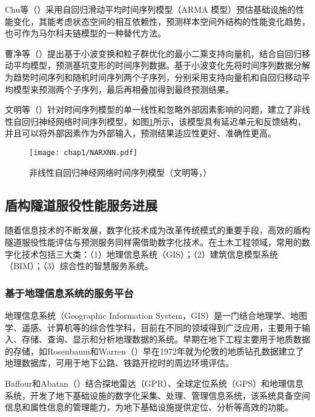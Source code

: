 Chu等（\citeyear{chu2007estimation}）采用自回归滑动平均时间序列模型（ARMA 模型）预估基础设施的性能变化，其能考虑状态空间的相互依赖性，预测样本空间外结构的性能变化趋势，也可作为马尔科夫链模型的一种替代方法。

曹净等（\citeyear{曹净2014基于}）提出基于小波变换和粒子群优化的最小二乘支持向量机，结合自回归移动平均模型，预测基坑变形的时间序列数据。基于小波变化先将时间序列数据分解为趋势时间序列和随机时间序列两个子序列，分别采用支持向量机和自回归移动平均模型来预测两个子序列，最后再相叠加得到最终预测结果。

文明等（\citeyear{文明2015地铁车站施工过程中地表沉降的}）针对时间序列模型的单一线性和忽略外部因素影响的问题，建立了非线性自回归神经网络时间序列模型，如图\ref{fig:非线性自回归神经网络}所示，该模型具有延迟单元和反馈结构，并且可以将外部因素作为外部输入，预测结果适应性更好、准确性更高。

\begin{figure}[!h]
	\centering
	\texttt{[image: chap1/NARXNN.pdf]}
	\caption{非线性自回归神经网络时间序列模型（文明等，\citeyear{文明2015地铁车站施工过程中地表沉降的}）}
	\label{fig:非线性自回归神经网络}
\end{figure}

\subsection{盾构隧道服役性能服务进展}
\label{chap:service-intro}

随着信息技术的不断发展，数字化技术成为改革传统模式的重要手段，高效的盾构隧道服役性能评估与预测服务同样需借助数字化技术。在土木工程领域，常用的数字化技术包括三大类：（1）地理信息系统（GIS）；（2）建筑信息模型系统（BIM）；（3）综合性的智慧服务系统。

\subsubsection{基于地理信息系统的服务平台}

地理信息系统（Geographic Information System，GIS）是一门结合地理学、地图学、遥感、计算机等的综合性学科，目前在不同的领域得到广泛应用，主要用于输入、存储、查询、显示和分析地理数据的系统。早期在地下工程主要用于地质数据的存储，如Rosenbaum和Warren（\citeyear{rosenbaum1986creating}）早在1972年就为伦敦的地质钻孔数据建立了地理数据库，可用于地下公路、铁路开挖时的周边环境评估。

Baffour和Abatan（\citeyear{baffour2002developing}）结合探地雷达（GPR）、全球定位系统（GPS）和地理信息系统，开发了地下基础设施的数字化采集、处理、管理信息系统，该系统具备空间信息和属性信息的管理能力，为地下基础设施提供定位、分析等高效的功能。

